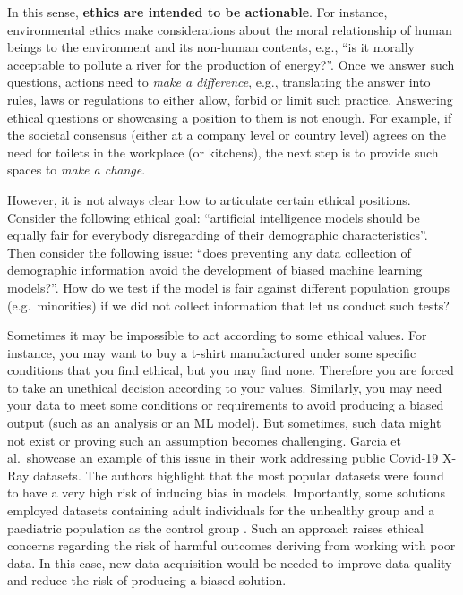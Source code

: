 \documentclass[
  12pt,
]{book}
\begin{document}
In this sense, \textbf{ethics are intended to be actionable}. For instance, environmental ethics \citep{sep-ethics-environmental} make considerations about the moral relationship of human beings to the environment and its non-human contents, e.g., ``is it morally acceptable to pollute a river for the production of energy?''. Once we answer such questions, actions need to \emph{make a difference}, e.g., translating the answer into rules, laws or regulations to either allow, forbid or limit such practice. Answering ethical questions or showcasing a position to them is not enough. For example, if the societal consensus (either at a company level or country level) agrees on the need for toilets in the workplace (or kitchens), the next step is to provide such spaces to \emph{make a change}.

However, it is not always clear how to articulate certain ethical positions. Consider the following ethical goal: ``artificial intelligence models should be equally fair for everybody disregarding of their demographic characteristics''. Then consider the following issue: ``does preventing any data collection of demographic information avoid the development of biased machine learning models?''. How do we test if the model is fair against different population groups (e.g.~minorities) if we did not collect information that let us conduct such tests?

Sometimes it may be impossible to act according to some ethical values. For instance, you may want to buy a t-shirt manufactured under some specific conditions that you find ethical, but you may find none. Therefore you are forced to take an unethical decision according to your values. Similarly, you may need your data to meet some conditions or requirements to avoid producing a biased output (such as an analysis or an ML model). But sometimes, such data might not exist or proving such an assumption becomes challenging. Garcia et al.~showcase an example of this issue in their work addressing public Covid-19 X-Ray datasets. The authors highlight that the most popular datasets were found to have a very high risk of inducing bias in models. Importantly, some solutions employed datasets containing adult individuals for the unhealthy group and a paediatric population as the control group \citep{santa2021public}. Such an approach raises ethical concerns regarding the risk of harmful outcomes deriving from working with poor data. In this case, new data acquisition would be needed to improve data quality and reduce the risk of producing a biased solution.
\end{document}
